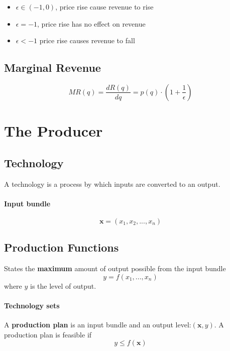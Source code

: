 \documentclass[a4paper] {scrartcl}
\begin{document}
\begin{itemize}
	\item $\epsilon\in(-1,0)$, price rise cause revenue to rise
	\item $\epsilon=-1$, price rise has no effect on revenue
	\item $\epsilon<-1$ price rise causes revenue to fall
\end{itemize}

\subsection{Marginal Revenue}
\begin{equation}
	MR(q) = \frac{dR(q)}{dq} = p(q)\cdot\left(1+\frac{1}{\epsilon}\right)
\end{equation}

\section{The Producer}
\subsection{Technology}
A technology is a process by which inputs are converted to an output.


\paragraph{Input bundle} %
\label{par:input_bundle}
\begin{equation}
	\mathbf{x}=(x_1, x_2, ..., x_n)
\end{equation}

\subsection{Production Functions}
States the \textbf{maximum} amount of output possible from the input bundle
\begin{equation}
	y = f(x_1, ..., x_n)
\end{equation}
where $y$ is the level of output.


\paragraph{Technology sets} %
\label{par:technology_sets}
A \textbf{production plan} is an input bundle and an output level:$(\mathbf{x}, y)$.
A production plan is feasible if 
\begin{equation}
	y\leq f(\mathbf{x})
\end{equation}
\end{document}
